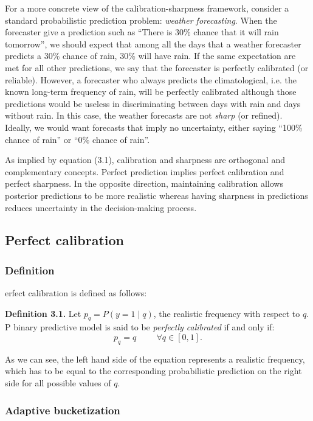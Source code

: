 For a more concrete view of the calibration-sharpness framework, consider a standard probabilistic prediction problem: \textit{weather forecasting}. When the forecaster give a prediction such as ``There is 30\% chance that it will rain tomorrow'', we should expect that among all the days that a weather forecaster predicts a 30\% chance of rain, 30\% will have rain. If the same expectation are met for all other predictions, we say that the forecaster is perfectly calibrated (or reliable). However, a forecaster who always predicts the climatological, i.e. the known long-term frequency of rain, will be perfectly calibrated although those predictions would be useless in discriminating between days with rain and days without rain. In this case, the weather forecasts are not \textit{sharp} (or refined). Ideally, we would want forecasts that imply no uncertainty, either saying ``100\% chance of rain'' or ``0\% chance of rain''. 

As implied by equation (3.1), calibration and sharpness are orthogonal and complementary concepts. Perfect prediction implies perfect calibration and perfect sharpness. In the opposite direction, maintaining calibration allows posterior predictions to be more realistic whereas having sharpness in predictions reduces uncertainty in the decision-making process.   

\subsection{Perfect calibration}

\subsubsection{Definition}

erfect calibration is defined as follows:

\textbf{Definition 3.1.} Let $p_q = P(y = 1 \mid q)$, the realistic frequency with respect to $q$. P binary predictive model is said to be \textit{perfectly calibrated} if and only if:
$$p_q = q \hspace{1cm} \forall q \in [0, 1].$$  

As we can see, the left hand side of the equation represents a realistic frequency, which has to be equal to the corresponding probabilistic prediction on the right side for all possible values of $q$. 

\subsubsection{Adaptive bucketization}

